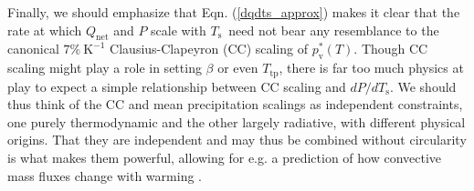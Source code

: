 \documentclass[9pt,twocolumn,twoside,lineno]{pnas-new}
\newcommand{\eqnref}[1]{(\ref{#1})}
\newcommand{\Qnet}{\ensuremath{Q_\mathrm{net}}}
\newcommand{\Kinverse}{\ensuremath{\mathrm{K^{-1}}}}
\newcommand{\pvstar}{\ensuremath{p^*_{\mathrm{v}}}}
\newcommand{\Ts}{\ensuremath{T_\mathrm{s}}}
\newcommand{\Ttp}{\ensuremath{T_\mathrm{tp}}}
\begin{document}
Finally, we should emphasize that Eqn. \eqnref{dqdts_approx} makes it clear that the rate at which $\Qnet$ and $P$ scale with \Ts\ need not bear any resemblance to the  canonical $7\%\ \Kinverse$ Clausius-Clapeyron (CC) scaling of $\pvstar(T)$. Though CC scaling might play a role in setting $\beta$ or even \Ttp, there is far too much physics at play to expect a simple relationship between CC scaling and $dP/d\Ts$. We should thus think of  the CC and mean precipitation scalings  as independent constraints, one purely thermodynamic and the other largely radiative, with different physical origins. That they are independent and may thus be combined without circularity is what makes them powerful, allowing for e.g. a prediction of how convective mass fluxes change with warming \cite[][]{held2006}.

%
\end{document}
